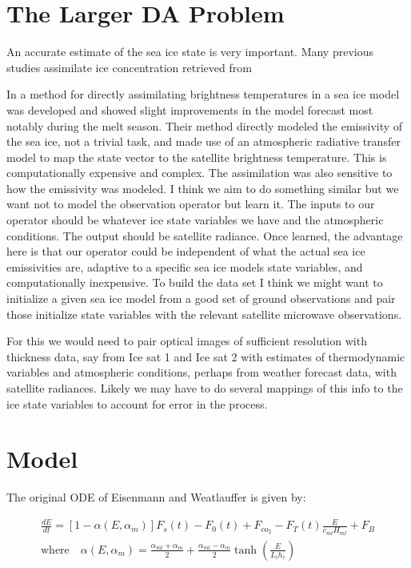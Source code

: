 \documentclass[10pt]{article}
\begin{document}
\section{The Larger DA Problem}

An accurate estimate of the sea ice state is very important. Many  previous studies assimilate ice concentration retrieved from 

In \cite{Scott12} a method for directly assimilating brightness temperatures in a sea ice model was developed and showed slight improvements in the model forecast most notably during the melt season. Their method directly modeled the emissivity of the sea ice, not a trivial task, and made use of an atmospheric radiative transfer model to map the state vector to the satellite brightness temperature. This is computationally expensive and complex. The assimilation was also sensitive to how the emissivity was modeled. I think we aim to do something similar but we want not to model the observation operator but learn it. The inputs to our operator should be whatever ice state variables we have and the atmospheric conditions. The output should be satellite radiance. Once learned, the advantage here is that our operator could be independent of what the actual sea ice emissivities are, adaptive to a specific sea ice models state variables, and computationally inexpensive. To build the data set I think we might want to initialize a given sea ice model from a good set of ground observations and pair those initialize state variables with the relevant satellite microwave observations. 

For this we would need to pair optical images of sufficient resolution with thickness data, say from Ice sat 1 and Ice sat 2 with estimates of thermodynamic variables and atmospheric conditions, perhaps from weather forecast data, with satellite radiances. Likely we may have to do several mappings of this info to the ice state variables to account for error in the process. 

\section{Model}

The original ODE of Eisenmann and Weatlauffer is given by:

{\small
\begin{align}
\frac{dE}{dt}=[1-\alpha(E,\alpha_{m})]F_s(t)-F_0(t)+F_{co_2}-F_T(t)\frac{E}{c_{ml} H_{ml}}+F_B \label{ew} \\
\textrm{where} \quad \alpha(E,\alpha_m)=\frac{\alpha_{ml}+\alpha_m}{2}+\frac{\alpha_{ml}-\alpha_m}{2}\tanh\left(\frac{E}{L_i h_{c}} \right) \label{alph}
\end{align}}
\end{document}
